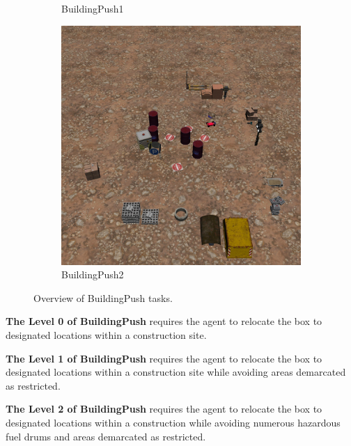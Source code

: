 \documentclass{article}
\begin{document}
\begin{figure}[H]
\begin{subfigure}{0.3\linewidth}
        \caption{BuildingPush1}
      \end{subfigure}
      \begin{subfigure}{0.3\linewidth}
        \centering
        \includegraphics[width=\linewidth]{assets/appendix/building_push2.pdf}
        \caption{BuildingPush2}
      \end{subfigure}
      \caption{Overview of BuildingPush tasks.}
\end{figure}

\textbf{The Level 0 of BuildingPush} requires the agent to relocate the box to designated locations within a construction site.

\textbf{The Level 1 of BuildingPush} requires the agent to relocate the box to designated locations within a construction site while avoiding areas demarcated as restricted.

\textbf{The Level 2 of BuildingPush} requires the agent to relocate the box to designated locations within a construction while avoiding numerous hazardous fuel drums and areas demarcated as restricted.
\end{document}
